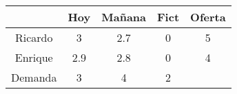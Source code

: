 \begin{tabular}{ccccc}
       & Hoy    & Mañana & Fict   & Oferta \bigstrut[b]\\
\hline
\hline
Ricardo & 3      & 2.7    & 0      & 5 \bigstrut[t]\\
Enrique & 2.9    & 2.8    & 0      & 4 \bigstrut[b]\\
\hline
\hline
Demanda & 3      & 4      & 2      &  \bigstrut[t]\\
\end{tabular}%
